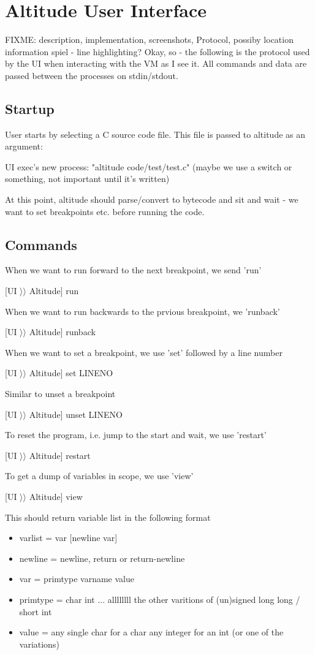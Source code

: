\documentclass[10pt,a4paper]{report}
\begin{document}
\section{Altitude User Interface}
FIXME: description, implementation, screenshots, Protocol, possiby location information spiel - line highlighting?
Okay, so - the following is the protocol used by the UI when interacting with the VM as I see it. All commands and data are passed between the processes on stdin/stdout.
\subsection{Startup}
User starts by selecting a C source code file. This file is passed to altitude as an argument:

UI exec's new process: "altitude code/test/test.c" (maybe we use a switch or something, not important until it's written)

At this point, altitude should parse/convert to bytecode and sit and wait - we want to set breakpoints etc. before running the code.

\subsection{Commands}

When we want to run forward to the next breakpoint, we send 'run'

[UI $\rangle\rangle$ Altitude] run

When we want to run backwards to the prvious breakpoint, we 'runback'

[UI $\rangle\rangle$ Altitude] runback

When we want to set a breakpoint, we use 'set' followed by a line number

[UI $\rangle\rangle$ Altitude] set LINENO

Similar to unset a breakpoint

[UI $\rangle\rangle$ Altitude] unset LINENO

To reset the program, i.e. jump to the start and wait, we use 'restart'

[UI $\rangle\rangle$ Altitude] restart

To get a dump of variables in scope, we use 'view'

[UI $\rangle\rangle$ Altitude] view

This should return variable list in the following format
\begin{itemize}
\item varlist = var [newline var]
\item newline = newline, return or return-newline
\item var = primtype varname value
\item primtype = char  int  ... allllllll the other varitions of (un)signed long long / short int
\item value = any single char for a char  any integer for an int (or one of the variations)
\end{itemize}
\end{document}
